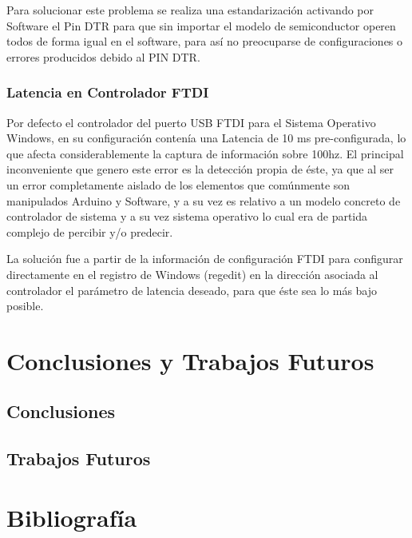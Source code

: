 \documentclass[12pt,a4paper]{article}
\begin{document}
Para solucionar este problema se realiza una estandarización activando por Software el Pin DTR para que sin importar el modelo de semiconductor operen todos de forma igual en el software, para así no preocuparse de configuraciones o errores producidos debido al PIN DTR.

\subsubsection{Latencia en Controlador FTDI}
Por defecto el controlador del puerto USB FTDI para el Sistema Operativo Windows, en su configuración contenía una Latencia de 10 ms pre-configurada, lo que afecta considerablemente la captura de información sobre 100hz. El principal inconveniente que genero este error es la detección propia de éste, ya que al ser un error completamente aislado de los elementos que comúnmente son manipulados Arduino y Software, y a su vez es relativo a un modelo concreto de controlador de sistema y a su vez sistema operativo lo cual era de partida complejo de percibir y/o predecir.

La solución fue a partir de la información de configuración FTDI\cite{FTDI} para configurar directamente  en el registro de Windows (regedit) en la dirección asociada al controlador el parámetro de latencia deseado, para que éste sea lo más bajo posible.

\section{Conclusiones y Trabajos Futuros}
\subsection{Conclusiones}

\subsection{Trabajos Futuros}

\section{Bibliografía}
\printbibliography[heading=none]
\end{document}
